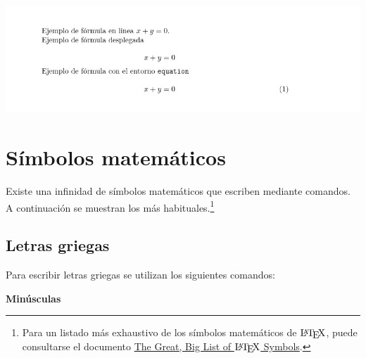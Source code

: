 \documentclass[
  a4paper,
]{scrreport}
\begin{document}
\begin{tcolorbox}[enhanced jigsaw, bottomrule=.15mm, leftrule=.75mm, opacityback=0, titlerule=0mm, bottomtitle=1mm, colbacktitle=quarto-callout-note-color!10!white, arc=.35mm, toprule=.15mm, colframe=quarto-callout-note-color-frame, title={Salida}, coltitle=black, colback=white, breakable, toptitle=1mm, rightrule=.15mm, left=2mm, opacitybacktitle=0.6]

\includegraphics{./img/formulas/entornos-matematicos.png}

\end{tcolorbox}

\hypertarget{suxedmbolos-matemuxe1ticos}{%
\section{Símbolos matemáticos}\label{suxedmbolos-matemuxe1ticos}}

Existe una infinidad de símbolos matemáticos que escriben mediante
comandos. A continuación se muestran los más habituales.\footnote{Para
  un listado más exhaustivo de los símbolos matemáticos de
  \(\text{\LaTeX}\), puede consultarse el documento
  \href{https://www3.nd.edu/~nmark/UsefulFacts/LaTeX_symbols.pdf}{The
  Great, Big List of \(\text{\LaTeX}\) Symbols}.}

\hypertarget{letras-griegas}{%
\subsection{Letras griegas}\label{letras-griegas}}

Para escribir letras griegas se utilizan los siguientes comandos:

\textbf{Minúsculas}
\end{document}
